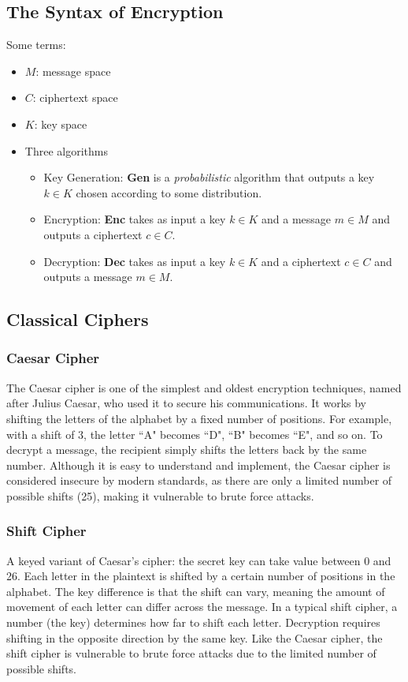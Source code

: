\subsection{The Syntax of Encryption}
Some terms:
\begin{itemize}
    \item $M$: message space
    \item $C$: ciphertext space
    \item $K$: key space
    \item Three algorithms
    \begin{itemize}
        \item Key Generation: \textbf{Gen} is a \emph{probabilistic} algorithm that outputs a key $k \in K$ chosen according to some distribution.
        \item Encryption: \textbf{Enc} takes as input a key $k \in K$ and a message $m \in M$ and outputs a ciphertext $c \in C$.
        \item Decryption: \textbf{Dec} takes as input a key $k \in K$ and a ciphertext $c \in C$ and outputs a message $m \in M$.
    \end{itemize}
\end{itemize}

\subsection{Classical Ciphers}

\subsubsection{Caesar Cipher}
The Caesar cipher is one of the simplest and oldest encryption techniques, named after Julius Caesar, who used it to secure his communications. It works by shifting the letters of the alphabet by a fixed number of positions. For example, with a shift of 3, the letter ``A" becomes ``D", ``B" becomes ``E", and so on. To decrypt a message, the recipient simply shifts the letters back by the same number. Although it is easy to understand and implement, the Caesar cipher is considered insecure by modern standards, as there are only a limited number of possible shifts (25), making it vulnerable to brute force attacks.

\subsubsection{Shift Cipher}
A keyed variant of Caesar's cipher: the secret key can take value between 0 and 26. Each letter in the plaintext is shifted by a certain number of positions in the alphabet. The key difference is that the shift can vary, meaning the amount of movement of each letter can differ across the message. In a typical shift cipher, a number (the key) determines how far to shift each letter. Decryption requires shifting in the opposite direction by the same key. Like the Caesar cipher, the shift cipher is vulnerable to brute force attacks due to the limited number of possible shifts.


